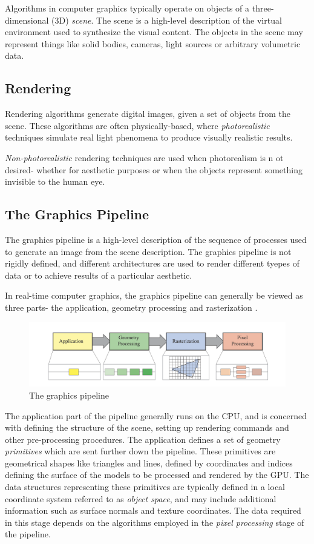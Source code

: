 \documentclass{article}
\begin{document}
Algorithms in computer graphics typically operate on objects of a three-dimensional (3D) \textit{scene}. The scene is a high-level description of the virtual environment used to synthesize the visual content.
The objects in the scene may represent things like solid bodies, cameras, light sources or arbitrary volumetric data.

\subsection{Rendering}
Rendering algorithms generate digital images, given a set of objects from the scene. These algorithms
are often physically-based, where \textit{photorealistic} techniques simulate real light phenomena to produce visually realistic results. 


\textit{Non-photorealistic} rendering techniques are used when photorealism is n    ot desired- whether for aesthetic purposes or when the objects represent something
invisible to the human eye. 

\subsection{The Graphics Pipeline}
The graphics pipeline is a high-level description of the sequence of processes used to 
generate an image from the scene description. The graphics pipeline is not rigidly defined,
and different architectures are used to render different tyepes of data or to achieve results of a particular aesthetic.

In real-time computer graphics, the graphics pipeline can generally be viewed as three parts- the application, geometry processing and rasterization \cite{RealTimeRendering}.

\begin{figure}[tbh]
    \centering
    \includegraphics[width=1.0\textwidth]{images/graphics_pipeline.png}
    \caption{The graphics pipeline \cite{RealTimeRendering}}
    \label{fig:pipelineRealTimeRendering}
\end{figure}

The application part of the pipeline generally runs on the CPU, and is concerned with defining the structure of the scene, setting up rendering commands and other pre-processing procedures.
The application defines a set of geometry \textit{primitives} which are sent further down the pipeline. These primitives
are geometrical shapes like triangles and lines, defined by coordinates and indices defining the surface of the models to be processed and rendered by the GPU.
The data structures representing these primitives are typically defined in a local coordinate system referred to as \textit{object space}, and may include additional information such as surface normals and texture coordinates. The data required
in this stage depends on the algorithms employed in the \textit{pixel processing} stage of the pipeline.
\end{document}
